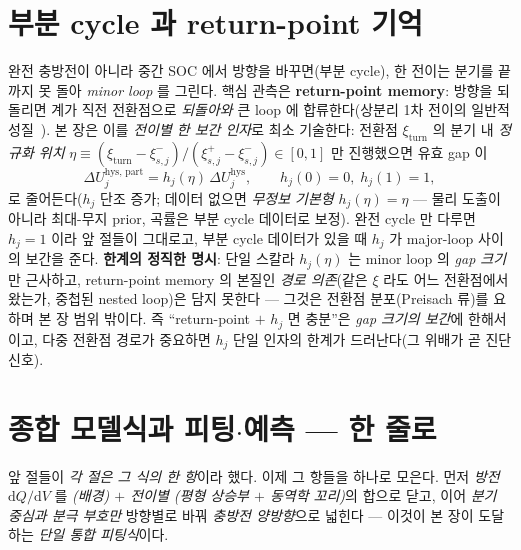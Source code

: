 \documentclass[11pt,a4paper]{article}
\newcommand{\dd}{\mathrm{d}}
\newcommand{\hys}{\mathrm{hys}}
\begin{document}
\section{부분 cycle 과 return-point 기억}\label{sec:hys_partial}
완전 충방전이 아니라 중간 SOC 에서 방향을 바꾸면(부분 cycle), 한 전이는 분기를 끝까지 못 돌아 \emph{minor loop}
를 그린다. 핵심 관측은 \textbf{return-point memory}: 방향을 되돌리면 계가 직전 전환점으로 \emph{되돌아와} 큰 loop
에 합류한다(상분리 1차 전이의 일반적 성질~\cite{sethna1993}). 본 장은 이를 \emph{전이별 한 보간 인자}로 최소
기술한다: 전환점 $\xi_\mathrm{turn}$ 의 분기 내 \emph{정규화 위치} $\eta\equiv(\xi_\mathrm{turn}-\xi_{s,j}^-)/(\xi_{s,j}^+-\xi_{s,j}^-)\in[0,1]$
만 진행했으면 유효 gap 이
\begin{equation}
\Delta U_{j}^{\hys,\,\mathrm{part}}=h_j(\eta)\,\Delta U_j^\hys,\qquad h_j(0)=0,\;h_j(1)=1,
\label{eq:hys_partial}
\end{equation}
로 줄어든다($h_j$ 단조 증가; 데이터 없으면 \emph{무정보 기본형} $h_j(\eta)=\eta$ — 물리 도출이 아니라 최대-무지 prior,
곡률은 부분 cycle 데이터로 보정).
완전 cycle 만 다루면 $h_j=1$ 이라 앞 절들이 그대로고, 부분 cycle 데이터가 있을 때 $h_j$ 가 major-loop 사이의 보간을
준다. \textbf{한계의 정직한 명시}: 단일 스칼라 $h_j(\eta)$ 는 minor loop 의 \emph{gap 크기}만 근사하고, return-point
memory 의 본질인 \emph{경로 의존}(같은 $\xi$ 라도 어느 전환점에서 왔는가, 중첩된 nested loop)은 담지 못한다 — 그것은
전환점 분포(Preisach 류)를 요하며 본 장 범위 밖이다. 즉 ``return-point $+$ $h_j$ 면 충분''은 \emph{gap 크기의 보간}에
한해서이고, 다중 전환점 경로가 중요하면 $h_j$ 단일 인자의 한계가 드러난다(그 위배가 곧 진단 신호).

\section{종합 모델식과 피팅$\cdot$예측 — 한 줄로}\label{sec:master}
앞 절들이 \emph{각 절은 그 식의 한 항}이라 했다. 이제 그 항들을 하나로 모은다. 먼저 \emph{방전} $\dd Q/\dd V$ 를
\emph{(배경) $+$ 전이별 (평형 상승부 $+$ 동역학 꼬리)}의 합으로 닫고, 이어 \emph{분기 중심과 분극 부호만} 방향별로
바꿔 \emph{충방전 양방향}으로 넓힌다 — 이것이 본 장이 도달하는 \emph{단일 통합 피팅식}이다.
\end{document}

